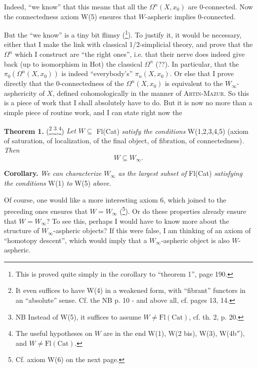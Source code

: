 \documentclass[11pt]{article}
\newcommand{\printedpage}[1]{\marginpar{\footnotesize p.~#1}}
\newcommand{\msp}[1]{\marginpar{\footnotesize [#1]}}
\begin{document}
Indeed, ``we know'' that this means that all the $\Omega^n(X, x_0)$ are 0-connected. Now the connectedness axiom W(5) ensures that $W$-aspheric implies 0-connected.

But the ``we know'' is a tiny bit flimsy (\footnote[25]{This is proved quite simply in the corollary to ``theorem 1'', page 190.}). To justify it, it would be necessary, either %
that I make the link with classical 1/2-simplicial theory, and prove that the $\Omega^n$ which I construct are ``the right ones'', i.e. that their nerve does indeed give back (up to isomorphism in Hot) the classical $\Omega^n$ (??). In particular, that the $\pi_0(\Omega^n(X, x_0))$ is indeed ``everybody's'' $\pi_n(X, x_0)$. Or else that I prove directly that the 0-connectedness of the $\Omega^n(X, x_0)$ is equivalent to the $W_\infty$-asphericity of $X$, defined cohomologically in the manner of \textsc{Artin-Mazur}. So this is a piece of work that I shall absolutely have to do. But it is now no more than a simple piece of routine work, and I can state right now the

\textbf{Theorem 1.} (\footnote[26]{It even suffices to have W(4) in a weakened form, with ``fibrant'' functors in an ``absolute'' sense. Cf. the NB p. 10 - and above all, cf. pages 13, 14.},\footnote[27]{NB Instead of W(5), it suffices to assume $W \neq \mathrm{Fl}(\mathrm{Cat})$, cf. th. 2, p. 20.},\footnote[28]{The useful hypotheses on $W$ are in the end W(1), W(2 bis), W(3), W(4b$''$), and $W \neq \mathrm{Fl}(\mathrm{Cat})$.}) \textit{Let $W \subseteq$} Fl(Cat) \textit{satisfy the conditions} W(1,2,3,4,5) (axiom of saturation, of localization, of the final object, of fibration, of connectedness)\textit{. Then}
\[ W \subseteq W_\infty . \]

\textbf{Corollary.} \textit{We can characterize $W_\infty$ as the largest subset of} Fl(Cat) \textit{satisfying the}
\msp{page 13}\textit{conditions} W(1) \textit{to} W(5) \textit{above.}

Of course, one would like a more interesting axiom 6, which joined to the preceding ones ensures that $W = W_\infty$ (\footnote[29]{Cf. axiom W(6) on the next page.}). Or do these properties already ensure that $W = W_\infty$? To see this, perhaps I would have to know more about the structure of $W_\infty$-aspheric objects? If this were false, I am thinking of an axiom of ``homotopy descent'', which would imply that a $W_\infty$-aspheric object is also $W$-aspheric.

\printedpage{11}
\end{document}
